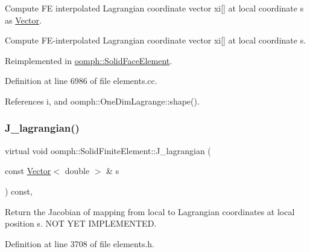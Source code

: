 Compute FE interpolated Lagrangian coordinate vector xi\mbox{[}\mbox{]} at local coordinate s as \hyperlink{classoomph_1_1Vector}{Vector}. 

Compute F\+E-\/interpolated Lagrangian coordinate vector xi\mbox{[}\mbox{]} at local coordinate s. 

Reimplemented in \hyperlink{classoomph_1_1SolidFaceElement_ae1c414e42a48c736a9b634e922dbb314}{oomph\+::\+Solid\+Face\+Element}.



Definition at line 6986 of file elements.\+cc.



References i, and oomph\+::\+One\+Dim\+Lagrange\+::shape().

\mbox{\label{classoomph_1_1SolidFiniteElement_a730703a0cb309a97743b6b49da15ef62}} 
\subsubsection{\texorpdfstring{J\+\_\+lagrangian()}{J\_lagrangian()}}
{\footnotesize\ttfamily virtual void oomph\+::\+Solid\+Finite\+Element\+::\+J\+\_\+lagrangian (\begin{DoxyParamCaption}\item[{const \hyperlink{classoomph_1_1Vector}{Vector}$<$ double $>$ \&}]{s }\end{DoxyParamCaption}) const\hspace{0.3cm}{\ttfamily [inline]}, {\ttfamily [virtual]}}



Return the Jacobian of mapping from local to Lagrangian coordinates at local position s. N\+OT Y\+ET I\+M\+P\+L\+E\+M\+E\+N\+T\+ED. 



Definition at line 3708 of file elements.\+h.

\mbox{\label{classoomph_1_1SolidFiniteElement_ace8b4aef572b9272648a7d1fc89d4664}} 
